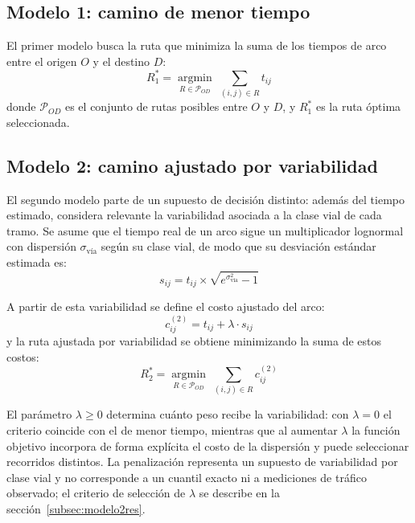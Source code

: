 \documentclass[11pt]{article}
\numberwithin{equation}{section}
\begin{document}
\subsection{Modelo 1: camino de menor tiempo}

El primer modelo busca la ruta que minimiza la suma de los tiempos de arco entre el origen $O$ y el destino $D$:
\begin{equation}
    R_1^{*} = \operatorname*{argmin}_{R \in \mathcal{P}_{OD}} \; \sum_{(i,j) \in R} t_{ij}
    \label{eq:modelo1}
\end{equation}
donde $\mathcal{P}_{OD}$ es el conjunto de rutas posibles entre $O$ y $D$, y $R_1^{*}$ es la ruta óptima seleccionada.

\subsection{Modelo 2: camino ajustado por variabilidad}

El segundo modelo parte de un supuesto de decisión distinto: además del tiempo estimado, considera relevante la variabilidad asociada a la clase vial de cada tramo. Se asume que el tiempo real de un arco sigue un multiplicador lognormal con dispersión $\sigma_{\text{vía}}$ según su clase vial, de modo que su desviación estándar estimada es:
\begin{equation}
    s_{ij} = t_{ij} \times \sqrt{e^{\sigma_{\text{vía}}^{2}} - 1}
    \label{eq:desviacion_arco}
\end{equation}

A partir de esta variabilidad se define el costo ajustado del arco:
\begin{equation}
    c^{(2)}_{ij} = t_{ij} + \lambda \cdot s_{ij}
    \label{eq:costo_ajustado}
\end{equation}
y la ruta ajustada por variabilidad se obtiene minimizando la suma de estos costos:
\begin{equation}
    R_2^{*} = \operatorname*{argmin}_{R \in \mathcal{P}_{OD}} \; \sum_{(i,j) \in R} c^{(2)}_{ij}
    \label{eq:modelo2}
\end{equation}

El parámetro $\lambda \geq 0$ determina cuánto peso recibe la variabilidad: con $\lambda = 0$ el criterio coincide con el de menor tiempo, mientras que al aumentar $\lambda$ la función objetivo incorpora de forma explícita el costo de la dispersión y puede seleccionar recorridos distintos. La penalización representa un supuesto de variabilidad por clase vial y no corresponde a un cuantil exacto ni a mediciones de tráfico observado; el criterio de selección de $\lambda$ se describe en la sección~\ref{subsec:modelo2res}.
\end{document}
